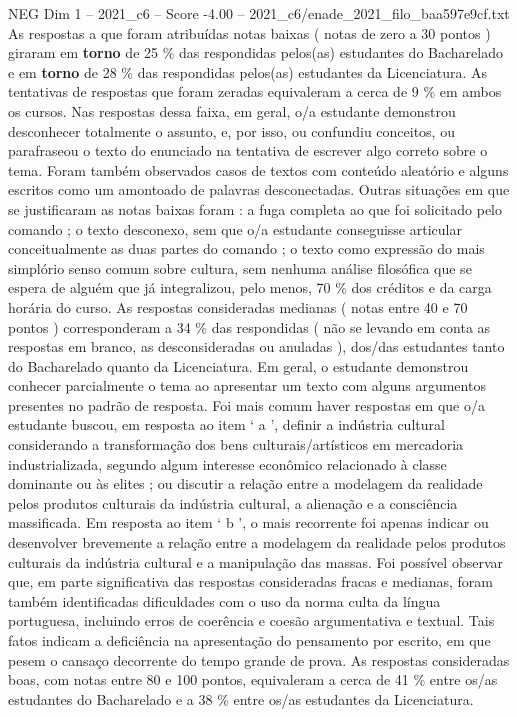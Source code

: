 \begin{textsample}{NEG Dim 1 – 2021\_c6 – Score -4.00 – 2021\_c6/enade\_2021\_filo\_baa597e9cf.txt}
As respostas a que foram atribuídas notas baixas ( notas de zero a 30 pontos ) giraram em \textbf{torno} de 25 \% das respondidas pelos(as) estudantes do Bacharelado e em \textbf{torno} de 28 \% das respondidas pelos(as) estudantes da Licenciatura.
As tentativas de respostas que foram zeradas equivaleram a cerca de 9 \% em ambos os cursos.
Nas respostas dessa faixa, em geral, o/a estudante demonstrou desconhecer totalmente o assunto, e, por isso, ou confundiu conceitos, ou parafraseou o texto do enunciado na tentativa de escrever algo correto sobre o tema.
Foram também observados casos de textos com conteúdo aleatório e alguns escritos como um amontoado de palavras desconectadas.
Outras situações em que se justificaram as notas baixas foram : a fuga completa ao que foi solicitado pelo comando ; o texto desconexo, sem que o/a estudante conseguisse articular conceitualmente as duas partes do comando ; o texto como expressão do mais simplório senso comum sobre cultura, sem nenhuma análise filosófica que se espera de alguém que já integralizou, pelo menos, 70 \% dos créditos e da carga horária do curso.
As respostas consideradas medianas ( notas entre 40 e 70 pontos ) corresponderam a 34 \% das respondidas ( não se levando em conta as respostas em branco, as desconsideradas ou anuladas ), dos/das estudantes tanto do Bacharelado quanto da Licenciatura.
Em geral, o estudante demonstrou conhecer parcialmente o tema ao apresentar um texto com alguns argumentos presentes no padrão de resposta.
Foi mais comum haver respostas em que o/a estudante buscou, em resposta ao item ‘ a ’, definir a indústria cultural considerando a transformação dos bens culturais/artísticos em mercadoria industrializada, segundo algum interesse econômico relacionado à classe dominante ou às elites ; ou discutir a relação entre a modelagem da realidade pelos produtos culturais da indústria cultural, a alienação e a consciência massificada.
Em resposta ao item ‘ b ’, o mais recorrente foi apenas indicar ou desenvolver brevemente a relação entre a modelagem da realidade pelos produtos culturais da indústria cultural e a manipulação das massas.
Foi possível observar que, em parte significativa das respostas consideradas fracas e medianas, foram também identificadas dificuldades com o uso da norma culta da língua portuguesa, incluindo erros de coerência e coesão argumentativa e textual.
Tais fatos indicam a deficiência na apresentação do pensamento por escrito, em que pesem o cansaço decorrente do tempo grande de prova.
As respostas consideradas boas, com notas entre 80 e 100 pontos, equivaleram a cerca de 41 \% entre os/as estudantes do Bacharelado e a 38 \% entre os/as estudantes da Licenciatura.

\end{textsample}
